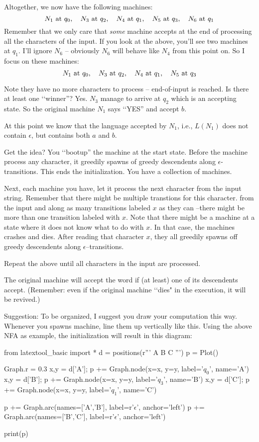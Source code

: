 Altogether, we now have the following machines:
\[
\text{$N_1$ at $q_0$, \,\,\,
  $N_3$ at $q_2$, \,\,\, $N_4$ at $q_1$, \,\,\,
  $N_5$ at $q_3$, \,\,\,
  $N_6$ at $q_1$}
\]
Remember that we only care that \textit{some} machine accepts
at the end of processing all the characters of the input.
If you look at the above, you'll see two machines at $q_1$.
I'll ignore $N_6$ -- obviously $N_6$ will behave like $N_4$ from this point on.
So I focus on these machines:
\[
\text{$N_1$ at $q_0$, \,\,\,
  $N_3$ at $q_2$, \,\,\, $N_4$ at $q_1$, \,\,\,
  $N_5$ at $q_3$}
\]

Note they have no more characters to process -- end-of-input is reached.
Is there at least one \lq\lq winner''? Yes. 
$N_3$ manage to arrive at $q_2$ which is an accepting state. 
So the original machine $N_1$ says \lq\lq YES'' and accept $b$.

At this point we know that the language accepted by $N_1$, i.e., 
$L(N_1)$ does not contain $\epsilon$, but contains both $a$ and $b$.

Get the idea? You \lq\lq bootup'' 
the machine at the start state. 
Before the machine process any character, it greedily spawns of greedy descendents along $\epsilon$-transitions.
This ends the initialization.
You have a collection of machines.

Next, each machine you have, let it process the next character from the
input string.
Remember that there might be multiple transtions for this character.
from the input and along as many transitions labeled $x$ as they can
--there might be more than one transition labeled with $x$.
Note that there might be a machine at a state where it does not
know what to do with $x$.
In that case, the machines crashes and dies.
After reading that character $x$,
they all greedily spawns off greedy descendents along $\epsilon$--transitions.

Repeat the above until all characters in the input are processed.

The original machine will accept the word if (at least) one of its
descendents accept.
(Remember: even if the original machine \lq\lq dies" in the
execution, it will be revived.)

Suggestion: To be organized, I suggest you draw your computation this way.
Whenever you spawns machine, line them up vertically like this.
Using the above NFA as example, the initialization will result in
this diagram:

\begin{python}
from latextool_basic import *
d = positions(r'''
A
B
C
''')
p = Plot()

Graph.r = 0.3
x,y = d['A']; p += Graph.node(x=x, y=y, label='$q_0$', name='A')
x,y = d['B']; p += Graph.node(x=x, y=y, label='$q_3$', name='B')
x,y = d['C']; p += Graph.node(x=x, y=y, label='$q_1$', name='C')

p += Graph.arc(names=['A','B'], label=r'$\epsilon$', anchor='left')
p += Graph.arc(names=['B','C'], label=r'$\epsilon$', anchor='left')

print(p)
\end{python}

